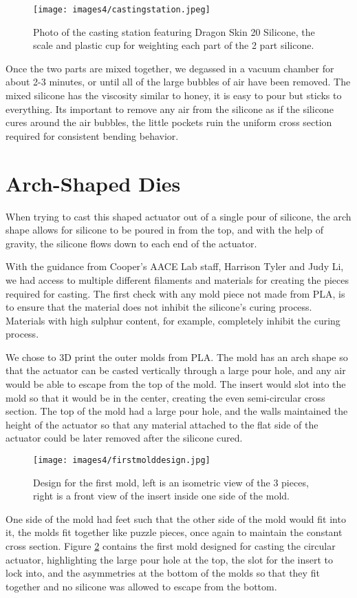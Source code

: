 \begin{figure}[h]
    \centering
    \texttt{[image: images4/castingstation.jpeg]}
    \caption{Photo of the casting station featuring Dragon Skin 20 Silicone, the scale and plastic cup for weighting each part of the 2 part silicone.}
    \label{fig:castingstation}
\end{figure}

Once the two parts are mixed together, we degassed in a vacuum chamber for about 2-3 minutes, or until all of the large bubbles of air have been removed. The mixed silicone has the viscosity similar to honey, it is easy to pour but sticks to everything. Its important to remove any air from the silicone as if the silicone cures around the air bubbles, the little pockets ruin the uniform cross section required for consistent bending behavior. 

\section{Arch-Shaped Dies}

When trying to cast this shaped actuator out of a single pour of silicone, the arch shape allows for silicone to be poured in from the top, and with the help of gravity, the silicone flows down to each end of the actuator. 

With the guidance from Cooper's AACE Lab staff, Harrison Tyler and Judy Li, we had access to multiple different filaments and materials for creating the pieces required for casting. The first check with any mold piece not made from PLA, is to ensure that the material does not inhibit the silicone's curing process. Materials with high sulphur content, for example, completely inhibit the curing process. 

We chose to 3D print the outer molds from PLA. The mold has an arch shape so that the actuator can be casted vertically through a large pour hole, and any air would be able to escape from the top of the mold. The insert would slot into the mold so that it would be in the center, creating the even semi-circular cross section. The top of the mold had a large pour hole, and the walls maintained the height of the actuator so that any material attached to the flat side of the actuator could be later removed after the silicone cured. 

\begin{figure}[h]
    \centering
    \texttt{[image: images4/firstmolddesign.jpg]}
    \caption{Design for the first mold, left is an isometric view of the 3 pieces, right is a front view of the insert inside one side of the mold.}
    \label{fig:firstmold}
\end{figure}

One side of the mold had feet such that the other side of the mold would fit into it, the molds fit together like puzzle pieces, once again to maintain the constant cross section. Figure \ref{fig:firstmold} contains the first mold designed for casting the circular actuator, highlighting the large pour hole at the top, the slot for the insert to lock into, and the asymmetries at the bottom of the molds so that they fit together and no silicone was allowed to escape from the bottom. 

